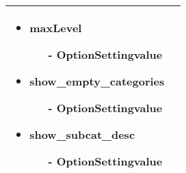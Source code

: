 \begin{minipage}{0.7\textwidth}
\begin{tabular}{|p{} | p{}|}
\begin{itemize}
\begin{enumerate}
	\end{enumerate} 
	\item maxLevel
	\begin{enumerate}
		\item[-] OptionSettingvalue
	\end{enumerate} 
	\item show\_empty\_categories
	\begin{enumerate}
			\item[-] OptionSettingvalue
	\end{enumerate} 
	\item show\_subcat\_desc
	\begin{enumerate}
		\item[-] OptionSettingvalue
	\end{enumerate} 
\end{itemize}
\\
\hline
\end{tabular}
\end{minipage}

